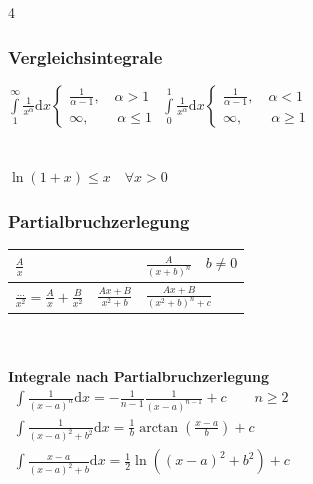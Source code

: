 \documentclass[6pt,a4paper]{scrartcl}
\begin{document}
\begin{multicols*}{4}
	\vspace{-1mm}
	\begin{sectionbox}
		\vspace{-2mm}
		\subsubsection{Vergleichsintegrale}
		$\int\limits_{1}^{\infty} \frac{1}{x^\alpha} \mathrm dx \begin{cases} \frac{1}{\alpha -1}, \quad \alpha > 1 \\ \infty, \qquad \alpha \le 1 \end{cases}$ \qquad
		$\int\limits_{0}^{1} \frac{1}{x^\alpha} \mathrm dx \begin{cases} \frac{1}{\alpha -1}, \quad \alpha < 1 \\ \infty, \qquad \alpha \ge 1 \end{cases}$\\ \\ \\
		$\ln(1+x) \le x \quad \forall x > 0$
	\end{sectionbox}

	\begin{sectionbox}
		\everymath{\displaystyle}
		\subsubsection{Partialbruchzerlegung}
		\begin{tabular}{l|l|l}
			$\frac{A}{x}$                                   &                      & $\frac{A}{(x+b)^n} \quad b \ne 0$ \\ \hline
			$\frac{\dots}{x^2}=\frac{A}{x} + \frac{B}{x^2}$ & $\frac{Ax+B}{x^2+b}$ & $\frac{Ax+B}{(x^2+b)^n + c}$
		\end{tabular}
		\\\\
		\textbf{Integrale nach Partialbruchzerlegung}\\
		\begin{math}\begin{array}{l}
				\int\frac{1}{(x-a)^n}\mathrm dx=-\frac{1}{n-1}\frac{1}{(x-a)^{n-1}}+c \qquad n \ge 2 \\
				\int\frac{1}{(x-a)^2+b^2}\mathrm dx=\frac{1}{b}\arctan(\frac{x-a}{b})+c              \\
				\int\frac{x-a}{(x-a)^2+b}\mathrm dx=\frac{1}{2}\ln((x-a)^2+b^2)+c
			\end{array}\end{math}


\end{sectionbox}
\end{multicols*}
\end{document}
